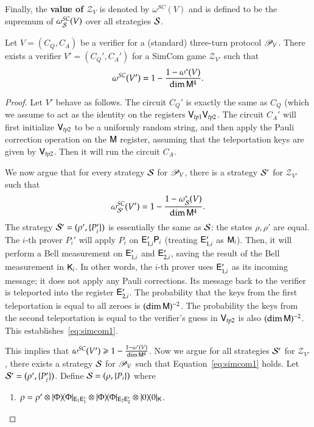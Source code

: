 Finally, the \textbf{value of $\mathscr{Z}_V$} is denoted by $\omega^{SC}(V)$ and is defined to be the supremum of $\omega^{SC}_{\mathcal{S}}(V)$ over all strategies $\mathcal{S}$.

\begin{lemma}
\label{lem:convert_to_simcom}
	Let $V = (C_Q,C_A)$ be a verifier for a (standard) three-turn protocol $\mathscr{P}_V$. There exists a verifier $V' = (C_Q',C_A')$ for a SimCom game $\mathscr{Z}_{V'}$ such that
	\[
		\omega^{SC}(V') = 1 - \frac{1 - \omega^*(V)}{\dim {\mathsf{M}}^4}.
	\]
\end{lemma}
\begin{proof}
	Let $V'$ behave as follows. The circuit $C_Q'$ is exactly the same as $C_Q$ (which we assume to act as the identity on the registers ${\mathsf{V}}_{tp1} {\mathsf{V}}_{tp2}$. The circuit $C_A'$ will first initialize ${\mathsf{V}}_{tp2}$ to be a uniformly random string, and then apply the Pauli correction operation on the ${\mathsf{M}}$ register, assuming that the teleportation keys are given by ${\mathsf{V}}_{tp2}$. Then it will run the circuit $C_A$. 
	
	We now argue that for every strategy $\mathcal{S}$ for $\mathscr{P}_V$, there is a strategy $\mathcal{S}'$ for $\mathscr{Z}_{V'}$ such that
	\begin{equation}
	\label{eq:simcom1}
		\omega^{SC}_{\strat'}(V') = 1 - \frac{1 - \omega^*_\strat(V)}{\dim \sM^4}.
	\end{equation}
	The strategy $\mathcal{S}' = (\rho',\{P_i'\})$ is essentially the same as $\mathcal{S}$: the states $\rho,\rho'$ are equal. The $i$-th prover $P_i'$ will apply $P_i$ on ${\mathsf{E}}_{1,i}' {\mathsf{P}}_i$ (treating ${\mathsf{E}}_{1,i}'$ as ${\mathsf{M}}_i$). Then, it will perform a Bell measurement on ${\mathsf{E}}_{1,i}'$ and ${\mathsf{E}}_{2,i}'$, saving the result of the Bell measurement in ${\mathsf{K}}_i$. In other words, the $i$-th prover uses ${\mathsf{E}}_{1,i}'$ as its incoming message; it does not apply any Pauli corrections. Its message back to the verifier is teleported into the register ${\mathsf{E}}_{2,i}'$. The probability that the keys from the first teleportation is equal to all zeroes is $(\dim {\mathsf{M}})^{-2}$. The probability the keys from the second teleportation is equal to the verifier's guess in ${\mathsf{V}}_{tp2}$ is also $(\dim {\mathsf{M}})^{-2}$. This establishes~\eqref{eq:simcom1}.
	
	This implies that $\omega^{SC}(V') \geqslant 1 - \frac{1 - \omega^*(V)}{\dim {\mathsf{M}}^4}$. Now we argue for all strategies $\mathcal{S}'$ for $\mathscr{Z}_{V'}$, there exists a strategy $\mathcal{S}$ for $\mathscr{P}_V$ such that Equation~\eqref{eq:simcom1} holds. Let $\mathcal{S}' = (\rho',\{ P_i' \})$. Define $\mathcal{S} = (\rho,\{P_i\})$ where
	\begin{enumerate}
		\item $\rho = \rho' \otimes |\Phi\rangle\! \langle \Phi|_{{\mathsf{E}}_1 {\mathsf{E}}_1'} \otimes |\Phi\rangle\! \langle \Phi|_{{\mathsf{E}}_2 {\mathsf{E}}_2'} \otimes |0\rangle\! \langle 0|_{{\mathsf{K}}}$. 
		

\end{enumerate}
\end{proof}
